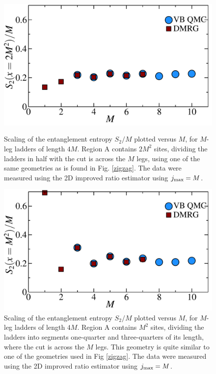 \begin{figure} {
	\vspace{-1cm}
	\hspace{1cm}
	\includegraphics[width=5in]{./figures/made/awesomeplot/marea2.pdf} 
	\caption[Entanglement entropy $S_2/M$ vs. $M$ for $M$-leg ladders of length $4M$ cut in half]{ 
Scaling of the entanglement entropy $S_2/M$ plotted versus $M$, for $M$-leg ladders of length $4M$.  
Region A contains $2M^2$ sites, dividing the ladders in half with the cut is across the $M$ legs, using one of the same geometries as is found in Fig. \ref{zigzag}.
The data were measured using the 2D improved ratio estimator using $j_{\rm max} = M$.
	\label{2Dbetter1}
	}
\vspace{1cm}
\hspace{1cm}
	\includegraphics[width=5in]{./figures/made/awesomeplot/marea.pdf} 
	\caption[Entanglement entropy $S_2/M$ vs. $M$ for $M$-leg ladders of length $4M$ with a different cut]{ 
	Scaling of the entanglement entropy $S_2/M$ plotted versus $M$, for $M$-leg ladders of length $4M$.  
Region A contains $M^2$ sites, dividing the ladders into segments one-quarter and three-quarters of its length, where the cut is across the $M$ legs.  This geometry is quite similar to one of the geometries used in Fig \ref{zigzag}.
The data were measured using the 2D improved ratio estimator using $j_{\rm max} = M$.
		\label{2Dbetter2}
	}

} \end{figure}


